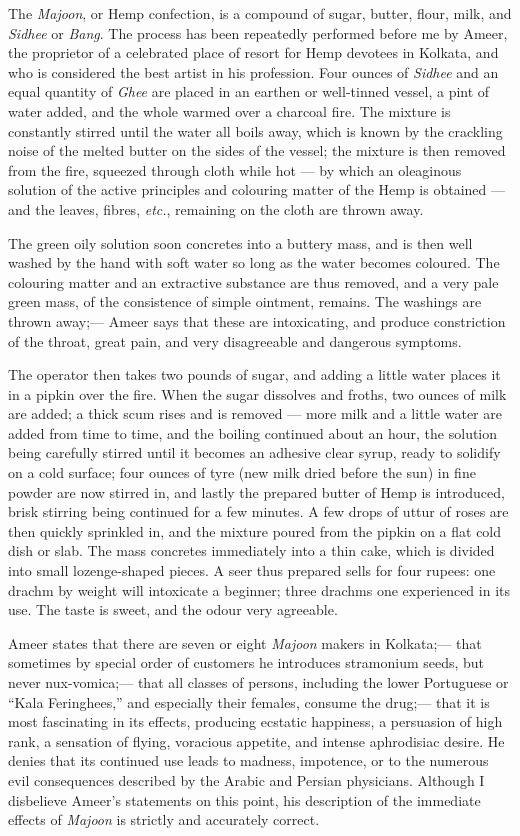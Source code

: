 \documentclass[a4paper, 11pt, oneside, polutonikogreek, english]{article}
\begin{document}
The \emph{Majoon}, or Hemp confection, is a compound of sugar, butter, flour, milk, and \emph{Sidhee} or \emph{Bang}. The process has been repeatedly performed before me by Ameer, the proprietor of a celebrated place of resort for Hemp devotees in Kolkata, and who is considered the best artist in his profession. Four ounces of \emph{Sidhee} and an equal quantity of \emph{Ghee} are placed in an earthen or well-tinned vessel, a pint of water added, and the whole warmed over a charcoal fire. The mixture is constantly stirred until the water all boils away, which is known by the crackling noise of the melted butter on the sides of the vessel; the mixture is then removed from the fire, squeezed through cloth while hot --- by which an oleaginous solution of the active principles and colouring matter of the Hemp is obtained --- and the leaves, fibres, \emph{etc.}, remaining on the cloth are thrown away.

The green oily solution soon concretes into a buttery mass, and is then well washed by the hand with soft water so long as the water becomes coloured. The colouring matter and an extractive substance are thus removed, and a very pale green mass, of the consistence of simple ointment, remains. The washings are thrown away;--- Ameer says that these are intoxicating, and produce constriction of the throat, great pain, and very disagreeable and dangerous symptoms.

The operator then takes two pounds of sugar, and adding a little water places it in a pipkin over the fire. When the sugar dissolves and froths, two ounces of milk are added; a thick scum rises and is removed --- more milk and a little water are added from time to time, and the boiling continued about an hour, the solution being carefully stirred until it becomes an adhesive clear syrup, ready to solidify on a cold surface; four ounces of tyre (new milk dried before the sun) in fine powder are now stirred in, and lastly the prepared butter of Hemp is introduced, brisk stirring being continued for a few minutes. A few drops of uttur of roses are then quickly sprinkled in, and the mixture poured from the pipkin on a flat cold dish or slab. The mass concretes immediately into a thin cake, which is divided into small lozenge-shaped pieces. A seer thus prepared sells for four rupees: one drachm by weight will intoxicate a beginner; three drachms one experienced in its use. The taste is sweet, and the odour very agreeable.

Ameer states that there are seven or eight \emph{Majoon} makers in Kolkata;--- that sometimes by special order of customers he introduces stramonium seeds, but never nux-vomica;--- that all classes of persons, including the lower Portuguese or ``Kala Feringhees,'' and especially their females, consume the drug;--- that it is most fascinating in its effects, producing ecstatic happiness, a persuasion of high rank, a sensation of flying, voracious appetite, and intense aphrodisiac desire. He denies that its continued use leads to madness, impotence, or to the numerous evil consequences described by the Arabic and Persian physicians. Although I disbelieve Ameer's statements on this point, his description of the immediate effects of \emph{Majoon} is strictly and accurately correct.
\end{document}
